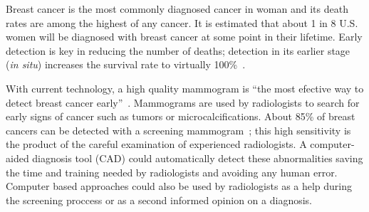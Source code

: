 Breast cancer is the most commonly diagnosed cancer in woman and its death rates are among the highest of any cancer. It is estimated that about 1 in 8 U.S. women will be diagnosed with breast cancer at some point in their lifetime. Early detection is key in reducing the number of deaths; detection in its earlier stage (\textit{in situ}) increases the survival rate to virtually 100\%~\cite{Howlader2014}.

With current technology, a high quality mammogram is ``the most efective way to detect breast cancer early''~\cite{Mammograms2014}. Mammograms are used by radiologists to search for early signs of cancer such as tumors or microcalcifications. About 85\% of breast cancers can be detected with a screening mammogram~\cite{PerformanceMammography2013}; this high sensitivity is the product of the careful examination of experienced radiologists. A computer-aided diagnosis tool (CAD) could automatically detect these abnormalities saving the time and training needed by radiologists and avoiding any human error. Computer based approaches could also be used by radiologists as a help during the screening proccess or as a second informed opinion on a diagnosis.
